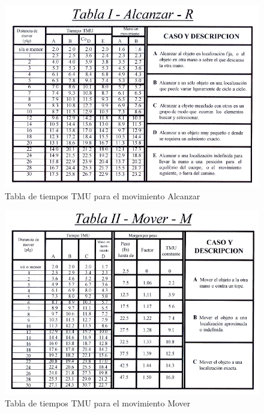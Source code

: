 \begin{figure}[H]
        \centering
        \includegraphics[trim = {0mm 0mm 0mm 0mm},clip,scale=0.2]{10/Img/tabla1.png}
        \caption{Tabla de tiempos TMU para el movimiento Alcanzar}
        \label{tabla1}
\end{figure}

\begin{figure}[H]
        \centering
        \includegraphics[trim = {0mm 0mm 0mm 0mm},clip,scale=0.2]{10/Img/tabla2.png}
        \caption{Tabla de tiempos TMU para el movimiento Mover}
        \label{tabla2}
\end{figure}

